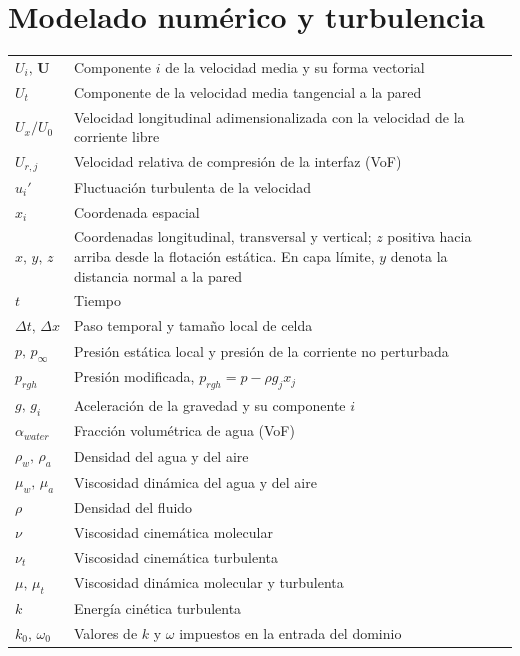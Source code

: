 \section*{Modelado numérico y turbulencia}
\begin{longtable}{@{}p{} p{}@{}}
$U_i,\,\mathbf{U}$ & Componente $i$ de la velocidad media y su forma vectorial \\
$U_t$       & Componente de la velocidad media tangencial a la pared \\
$U_x/U_0$   & Velocidad longitudinal adimensionalizada con la velocidad de la corriente libre \\
$U_{r,j}$   & Velocidad relativa de compresión de la interfaz (VoF) \\
$u_i'$      & Fluctuación turbulenta de la velocidad \\
$x_i$       & Coordenada espacial \\
$x,\,y,\,z$ & Coordenadas longitudinal, transversal y vertical; $z$ positiva hacia arriba desde la flotación estática. En capa límite, $y$ denota la distancia normal a la pared \\
$t$         & Tiempo \\
$\Delta t,\,\Delta x$ & Paso temporal y tamaño local de celda \\
$p,\,p_\infty$ & Presión estática local y presión de la corriente no perturbada \\
$p_{rgh}$   & Presión modificada, $p_{rgh}=p-\rho g_j x_j$ \\
$g,\,g_i$   & Aceleración de la gravedad y su componente $i$ \\
$\alpha_{water}$ & Fracción volumétrica de agua (VoF) \\
$\rho_w,\,\rho_a$ & Densidad del agua y del aire \\
$\mu_w,\,\mu_a$ & Viscosidad dinámica del agua y del aire \\
$\rho$      & Densidad del fluido \\
$\nu$       & Viscosidad cinemática molecular \\
$\nu_t$     & Viscosidad cinemática turbulenta \\
$\mu,\,\mu_t$ & Viscosidad dinámica molecular y turbulenta \\
$k$         & Energía cinética turbulenta \\
$k_0,\,\omega_0$ & Valores de $k$ y $\omega$ impuestos en la entrada del dominio \\

\end{longtable}
